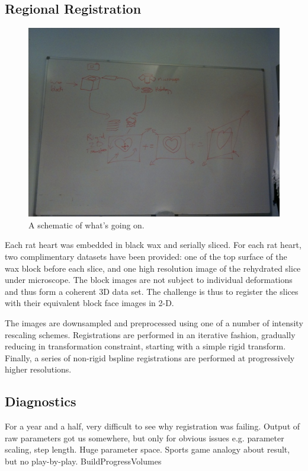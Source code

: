    
  
  \subsection{Regional Registration} %
  \label{sub:regional_registration}
    
  
  
  \begin{figure}[htbp]
    \centering
    \includegraphics[height=0.7\textwidth]{Ch6/Figs/process_diagram}
    \caption{A schematic of what's going on.}
  \end{figure}
  

  
  Each rat heart was embedded in black wax and serially sliced. For each rat heart, two complimentary datasets have been provided: one of the top surface of the wax block before each slice, and one high resolution image of the rehydrated slice under microscope. The block images are not subject to individual deformations and thus form a coherent 3D data set. The challenge is thus to register the slices with their equivalent block face images in 2-D.
  
  The images are downsampled and preprocessed using one of a number of intensity rescaling schemes. Registrations are performed in an iterative fashion, gradually reducing in transformation constraint, starting with a simple rigid transform. Finally, a series of non-rigid bspline registrations are performed at progressively higher resolutions.
   
    \subsection{Diagnostics} %
    \label{sub:diagnostics}
      For a year and a half, very difficult to see why registration was failing. Output of raw parameters got us somewhere, but only for obvious issues e.g. parameter scaling, step length. Huge parameter space. Sports game analogy about result, but no play-by-play. BuildProgressVolumes
      
